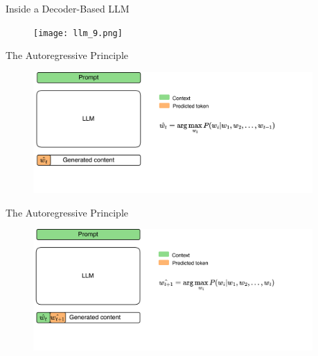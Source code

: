 \documentclass[11pt,aspectratio=169]{beamer}
\begin{document}
\begin{frame}{Inside a Decoder-Based LLM}
    \begin{figure}
        \centering
        \texttt{[image: llm\_9.png]}
    \end{figure}
\end{frame}

\begin{frame}{The Autoregressive Principle}
    \begin{figure}
        \centering
        \includegraphics[width=0.95\textwidth]{llm_autoregressive_1.png}
    \end{figure}
\end{frame}

\begin{frame}{The Autoregressive Principle}
    \begin{figure}
        \centering
        \includegraphics[width=0.95\textwidth]{llm_autoregressive_2.png}
    \end{figure}
\end{frame}

\end{document}
